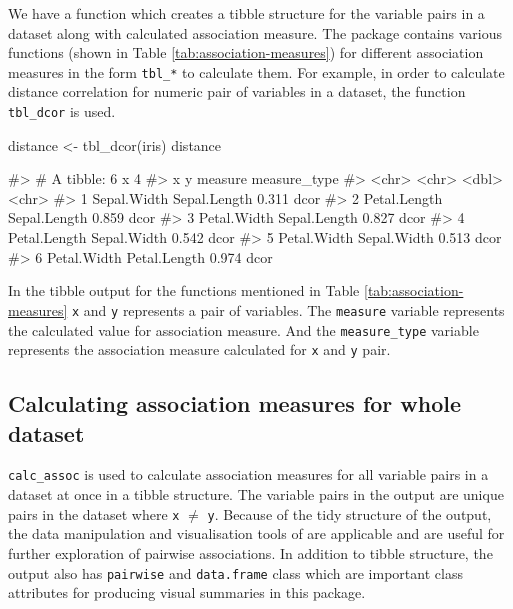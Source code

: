 We have a function which creates a tibble structure for the variable
pairs in a dataset along with calculated association measure. The
package contains various functions (shown in Table
\ref{tab:association-measures}) for different association measures in
the form \texttt{tbl\_*} to calculate them. For example, in order to
calculate distance correlation for numeric pair of variables in a
dataset, the function \texttt{tbl\_dcor} is used.

\begin{Schunk}
\begin{Sinput}
distance <- tbl_dcor(iris)
distance
\end{Sinput}
\begin{Soutput}
#> # A tibble: 6 x 4
#>   x            y            measure measure_type
#>   <chr>        <chr>          <dbl> <chr>       
#> 1 Sepal.Width  Sepal.Length   0.311 dcor        
#> 2 Petal.Length Sepal.Length   0.859 dcor        
#> 3 Petal.Width  Sepal.Length   0.827 dcor        
#> 4 Petal.Length Sepal.Width    0.542 dcor        
#> 5 Petal.Width  Sepal.Width    0.513 dcor        
#> 6 Petal.Width  Petal.Length   0.974 dcor
\end{Soutput}
\end{Schunk}

In the tibble output for the functions mentioned in Table
\ref{tab:association-measures} \texttt{x} and \texttt{y} represents a
pair of variables. The \texttt{measure} variable represents the
calculated value for association measure. And the \texttt{measure\_type}
variable represents the association measure calculated for \texttt{x}
and \texttt{y} pair.

\hypertarget{calculating-association-measures-for-whole-dataset}{%
\subsection{Calculating association measures for whole
dataset}\label{calculating-association-measures-for-whole-dataset}}

\texttt{calc\_assoc} is used to calculate association measures for all
variable pairs in a dataset at once in a tibble structure. The variable
pairs in the output are unique pairs in the dataset where \texttt{x}
\(\neq\) \texttt{y}. Because of the tidy structure of the output, the
data manipulation and visualisation tools of 
\citep{tidyverse} are applicable and are useful for further exploration
of pairwise associations. In addition to tibble structure, the output
also has \texttt{pairwise} and \texttt{data.frame} class which are
important class attributes for producing visual summaries in this
package.

